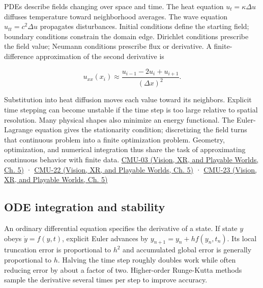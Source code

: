 PDEs describe fields changing over space and time. The heat equation \(u_t=\kappa\Delta u\) diffuses temperature toward neighborhood averages. The wave equation \(u_{tt}=c^2\Delta u\) propagates disturbances. Initial conditions define the starting field; boundary conditions constrain the domain edge. Dirichlet conditions prescribe the field value; Neumann conditions prescribe flux or derivative. A finite-difference approximation of the second derivative is

\[
u_{xx}(x_i)\approx\frac{u_{i-1}-2u_i+u_{i+1}}{(\Delta x)^2}.
\]

Substitution into heat diffusion moves each value toward its neighbors. Explicit time stepping can become unstable if the time step is too large relative to spatial resolution. Many physical shapes also minimize an energy functional. The Euler-Lagrange equation gives the stationarity condition; discretizing the field turns that continuous problem into a finite optimization problem. Geometry, optimization, and numerical integration thus share the task of approximating continuous behavior with finite data. \href{../07-Vision-XR-and-Playable-Worlds/main.pdf\#nameddest=04-visual-computing-ii-ch036-cmu-03---vector-calculus-preview}{CMU-03 (Vision, XR, and Playable Worlds, Ch. 5)} · \href{../07-Vision-XR-and-Playable-Worlds/main.pdf\#nameddest=04-visual-computing-ii-ch036-cmu-22---optimization}{CMU-22 (Vision, XR, and Playable Worlds, Ch. 5)} · \href{../07-Vision-XR-and-Playable-Worlds/main.pdf\#nameddest=04-visual-computing-ii-ch036-cmu-23---physically-based-animation-and-pdes}{CMU-23 (Vision, XR, and Playable Worlds, Ch. 5)}

\subsection{ODE integration and stability}\label{04-visual-computing-ii-ch029-ode-integration-and-stability}

\hypertarget{04-visual-computing-ii-ch029-ode-integration-and-stability}{}

An ordinary differential equation specifies the derivative of a state. If state \(y\) obeys \(\dot y=f(y,t)\), explicit Euler advances by \(y_{n+1}=y_n+h f(y_n,t_n)\). Its local truncation error is proportional to \(h^2\) and accumulated global error is generally proportional to \(h\). Halving the time step roughly doubles work while often reducing error by about a factor of two. Higher-order Runge-Kutta methods sample the derivative several times per step to improve accuracy.

